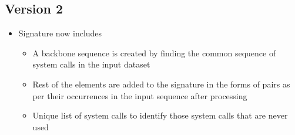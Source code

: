 \subsection{Version 2}
\begin{itemize}
    \item[] {Signature now includes}
        \begin{itemize}
            \item[] A backbone sequence is created by finding the common sequence of system calls in the input dataset
            \item[] Rest of the elements are added to the signature in the forms of pairs as per their occurrences in the input sequence after processing
            \item[] Unique list of system calls to identify those system calls that are never used
        \end{itemize}
\end{itemize}
